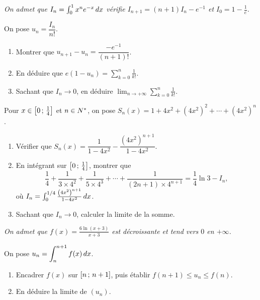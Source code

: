 \begin{annales}
\emph{On admet que $I_{n} = \int_{0}^{1}x^{n}e^{-x}\,dx$ vérifie
$I_{n+1} = (n+1)I_{n}-e^{-1}$ et $I_{0} = 1-\frac1e$.}

On pose $u_{n} = \dfrac{I_{n}}{n!}$.
\begin{enumerate}[label=\textbf{\alph*)}, leftmargin=*, itemsep=0.15em]
  \item Montrer que $u_{n+1}-u_{n} = \dfrac{-e^{-1}}{(n+1)!}$.
  \item En déduire que
        $e\left(1-u_{n}\right) = \displaystyle\sum_{k=0}^{n}\frac{1}{k!}$.
  \item Sachant que $I_{n} \to 0$, en déduire
        $\displaystyle\lim_{n\to+\infty}\sum_{k=0}^{n}\frac{1}{k!}$.
\end{enumerate}

Pour $x \in \left[0\,;\,\frac14\right]$ et $n \in N^{*}$, on pose
$S_{n}(x) = 1+4x^{2}+\left(4x^{2}\right)^{2}+\cdots+\left(4x^{2}\right)^{n}$.
\begin{enumerate}[label=\textbf{\alph*)}, leftmargin=*, itemsep=0.15em]
  \item Vérifier que
        $S_{n}(x) = \dfrac{1}{1-4x^{2}}-\dfrac{\left(4x^{2}\right)^{n+1}}{1-4x^{2}}$.
  \item En intégrant sur $\left[0\,;\,\frac14\right]$, montrer que
        \[
          \frac14+\frac{1}{3\times4^{2}}+\frac{1}{5\times4^{3}}+\cdots
          +\frac{1}{(2n+1)\times4^{n+1}} = \frac14\ln3-I_{n},
        \]
        où $I_{n} = \int_{0}^{1/4}\frac{\left(4x^{2}\right)^{n+1}}{1-4x^{2}}\,dx$.
  \item Sachant que $I_{n} \to 0$, calculer la limite de la somme.
\end{enumerate}

\emph{On admet que $f(x) = \frac{6\ln(x+3)}{x+3}$ est décroissante et tend
vers $0$ en $+\infty$.}

On pose $u_{n} = \displaystyle\int_{n}^{n+1}f(x)\,dx$.
\begin{enumerate}[label=\textbf{\alph*)}, leftmargin=*, itemsep=0.15em]
  \item Encadrer $f(x)$ sur $\left[n\,;\,n+1\right]$, puis établir
        $f(n+1) \leq u_{n} \leq f(n)$.
  \item En déduire la limite de $(u_{n})$.
\end{enumerate}


\end{annales}
